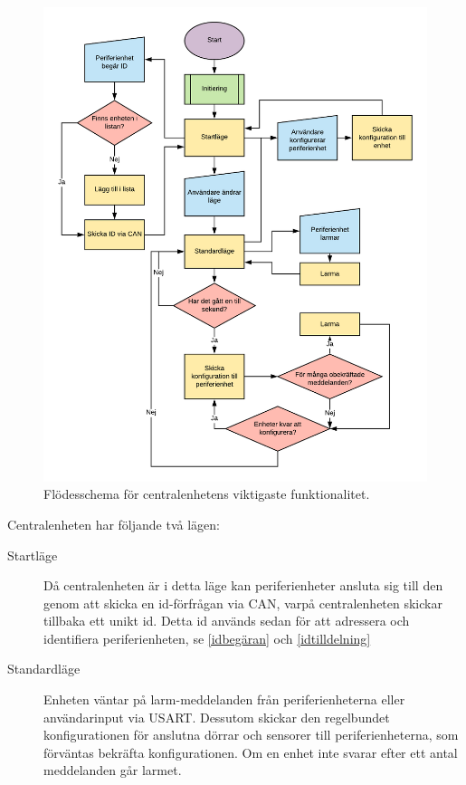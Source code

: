\documentclass{article}
\begin{document}
\begin{figure}[H]
    \centering
    \includegraphics[scale=0.3]{figurer/Centralenhet.png}
    \caption{Flödesschema för centralenhetens viktigaste funktionalitet.}
    \label{fig:centralflöde}
\end{figure}

Centralenheten har följande två lägen:

\begin{description}
    \item[Startläge] Då centralenheten är i detta läge kan periferienheter ansluta sig till den genom att skicka en id-förfrågan via CAN, varpå centralenheten skickar tillbaka ett unikt id. Detta id används sedan för att adressera och identifiera periferienheten, se \ref{idbegäran} och \ref{idtilldelning}


    \item[Standardläge] Enheten väntar på larm-meddelanden från periferienheterna eller användarinput via USART. Dessutom skickar den regelbundet konfigurationen för anslutna dörrar och sensorer till periferienheterna, som förväntas bekräfta konfigurationen.
    Om en enhet inte svarar efter ett antal meddelanden går larmet.
\end{description}
\end{document}

